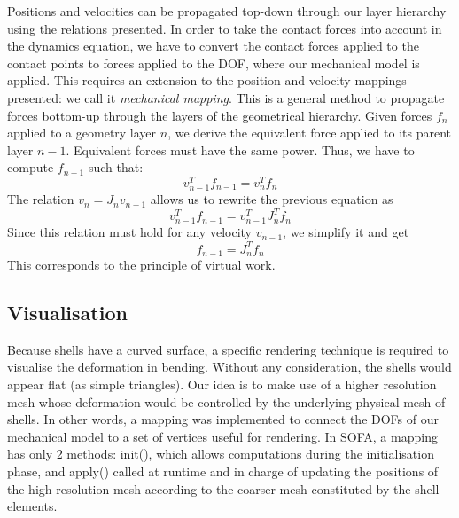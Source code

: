 Positions and velocities can be propagated top-down through our layer hierarchy using the relations presented. In order to take the contact forces into account in the dynamics equation, we have to convert the contact forces applied to the contact points to forces applied to the DOF, where our mechanical model is applied. This requires an extension to the position and velocity mappings presented: we call it \emph{mechanical mapping}. This is a general method to propagate forces bottom-up through the layers of the geometrical hierarchy. Given forces $f_n$ applied to a geometry layer $n$, we derive the equivalent force applied to its parent layer $n-1$. Equivalent forces must have the same power. Thus, we have to compute $f_{n-1}$ such that:
$$
v_{n-1}^T f_{n-1} = v_n^T f_n
$$
The relation $v_{n} = J_{n}v_{n-1}$ allows us to rewrite the previous equation as
$$
v_{n-1}^T f_{n-1} = v_{n-1}^T J_{n}^T f_n
$$
Since this relation must hold for any velocity $v_{n-1}$, we simplify it and get
\begin{equation} \label{eq:mapF}
f_{n-1} = J_n^T f_n
\end{equation}
This corresponds to the principle of virtual work.


\subsection{Visualisation}
Because shells have a curved surface, a specific rendering technique is required to visualise the deformation in bending. Without any consideration, the shells would appear flat (as simple triangles). Our idea is to make use of a higher resolution mesh whose deformation would be controlled by the underlying physical mesh of shells. In other words, a mapping was implemented to connect the DOFs of our mechanical model to a set of vertices useful for rendering. In SOFA, a mapping has only 2 methods: init(), which allows computations during the initialisation phase, and apply() called at runtime and in charge of updating the positions of the high resolution mesh according to the coarser mesh constituted by the shell elements. 

